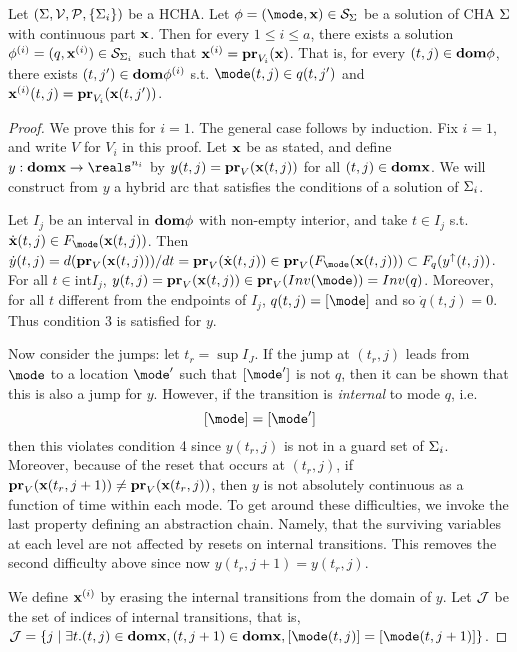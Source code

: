 \begin{thm}
	Let $(\Sys,\Vc,\Pc,\{\Sys_i\})$ be a HCHA.
	Let $\hstraj =(\mode,\sttraj) \in \Sc_{\Sys}$ be a solution of CHA $\Sys$ with continuous part $\sttraj$.
	Then for every $1 \leq i \leq a$, 
	there exists a solution 
	$\hstraj^{(i)} = (q,\sttraj^{(i)}) \in \Sc_{\Sys_i}$ 
	such that $\sttraj^{(i)} = \proj{\sttraj}{V_i}$.
	That is, for every $(t,j) \in \dom \hstraj$, there exists $(t,j') \in \dom \hstraj^{(i)}$
	s.t. $\mode(t,j) \in q(t,j')$
	and	$\sttraj^{(i)}(t,j) = \proj{\sttraj(t,j')}{V_i}$.
\end{thm}

\begin{proof}
	We prove this for $i=1$. The general case follows by induction.
	Fix $i=1$, and write $V$ for $V_i$ in this proof.
	Let $\sttraj$ be as stated, and define 
	$y: \dom \sttraj \rightarrow \reals^{n_i}$ by 
	$y(t,j) = \proj{\sttraj(t,j)}{V}$ for all $(t,j) \in \dom \sttraj$.
	We will construct from $y$ a hybrid arc that satisfies the conditions of a solution of $\Sys_i$.
	
	Let $I_j$ be an interval in $\dom \hstraj$ with non-empty interior, and take $t \in I_j$ s.t. 
	$\dot{\sttraj}(t,j) \in F_\mode(\sttraj(t,j))$. 
	Then $\dot{y}(t,j) = d(\proj{\sttraj(t,j)}{V})/dt = \proj{\dot{\sttraj}(t,j)}{V} \in \proj{F_\mode(\sttraj(t,j))}{V} \subset F_q(y^{\uparrow}(t,j))$.	
	For all $t \in \text{int}I_j$, $y(t,j) = \proj{\sttraj(t,j)}{V} \in \proj{Inv(\mode)}{V} = Inv(q)$.
	Moreover, for all $t$ different from the endpoints of $I_j$, $q(t,j) = [\mode]$ and so $\dot{q}(t,j) =0$.
	Thus condition 3 is satisfied for $y$.
	
	Now consider the jumps: let $t_r = \sup I_J$. 
	If the jump at $(t_r,j)$ leads from $\mode$ to a location $\mode'$ such that $[\mode']$ is not $q$, then it can be shown that this is also a jump for $y$.
	However, if the transition is \emph{internal} to mode $q$, i.e. 
	\[[\mode]=[\mode']\]
	then this violates condition 4 since $y(t_r,j)$ is not in a guard set of $\Sys_i$.
	Moreover, because of the reset that occurs at $(t_r,j)$, if $\proj{\sttraj(t_r,j+1)}{V}\neq \proj{\sttraj(t_r,j)}{V}$, then $y$ is not absolutely continuous as a function of time within each mode.
	To get around these difficulties, we invoke the last property defining an abstraction chain.
	Namely, that the surviving variables at each level are not affected by resets on internal transitions.
	This removes the second difficulty above since now $y(t_r,j+1) = y(t_r,j)$.
	
	We define $\sttraj^{(i)}$ by erasing the internal transitions from the domain of $y$.
	Let $\Jc$ be the set of indices of internal transitions, that is, $\Jc = \{j \sut \exists t.(t,j) \in \dom \sttraj, (t,j+1) \in \dom \sttraj, [\mode(t,j)]=[\mode(t,j+1)]\}$.		
	
\end{proof}

